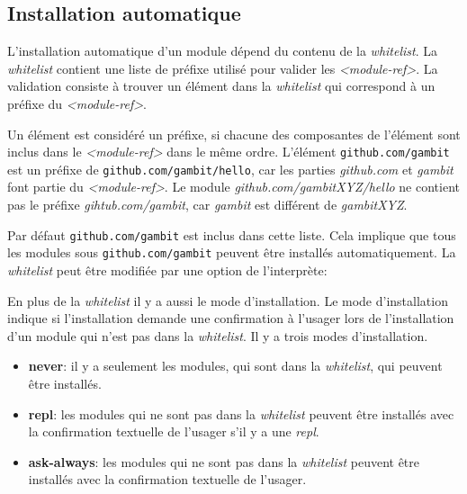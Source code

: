 \subsection{Installation automatique}
%
L'installation automatique d'un module dépend du contenu de la
\textit{whitelist}.  La \textit{whitelist} contient une liste de préfixe
utilisé pour valider les \textit{<module-ref>}. La validation consiste
à trouver un élément dans la \textit{whitelist} qui correspond à un
préfixe du \textit{<module-ref>}.

Un élément est considéré un préfixe, si chacune des composantes de l'élément
sont inclus dans le \textit{<module-ref>} dans le même ordre. L'élément
\texttt{github.com/gambit} est un préfixe de \texttt{github.com/gambit/hello},
car les parties \textit{github.com} et \textit{gambit} font partie du
\textit{<module-ref>}. Le module \textit{github.com/gambitXYZ/hello} ne
contient pas le préfixe \textit{gihtub.com/gambit}, car \textit{gambit} est
différent de \textit{gambitXYZ}.

Par défaut \texttt{github.com/gambit} est inclus dans cette liste.
Cela implique que tous les modules sous \texttt{github.com/gambit}
peuvent être installés automatiquement. La \textit{whitelist} peut
être modifiée par une option de l'interprète:

\begin{center}
\end{center}

En plus de la \textit{whitelist} il y a aussi le mode d'installation.
Le mode d'installation indique si l'installation demande une confirmation
à l'usager lors de l'installation d'un module qui n'est pas dans la
\textit{whitelist}. Il y a trois modes d'installation.
\begin{itemize}
  \item \textbf{never}: il y a seulement les modules, qui sont dans la
    \textit{whitelist}, qui peuvent être installés.

  \item \textbf{repl}: les modules qui ne sont pas dans la \textit{whitelist}
    peuvent être installés avec la confirmation textuelle de l'usager s'il y a
    une \textit{repl}.

  \item \textbf{ask-always}: les modules qui ne sont pas dans la \textit{whitelist}
    peuvent être installés avec la confirmation textuelle de l'usager.
\end{itemize}

